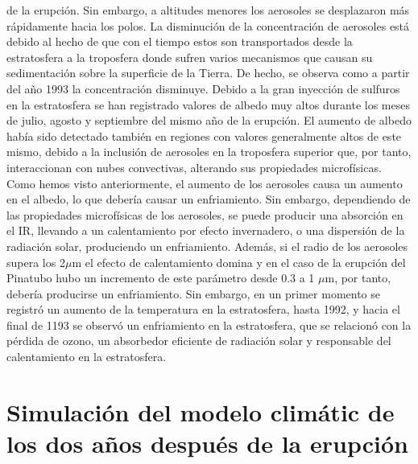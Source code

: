 \documentclass[a4apaper,twocolumn,10pt]{article}
\begin{document}
de la erupci\'on. Sin embargo, a altitudes menores los aerosoles se desplazaron m\'as r\'apidamente hacia los polos. La disminuci\'on de la concentraci\'on de aerosoles est\'a debido al hecho de que con el tiempo estos son transportados desde la estratosfera a la troposfera donde sufren varios mecanismos que causan su sedimentaci\'on sobre la superficie de la Tierra. De hecho, se observa como a partir del a\~no 1993 la concentraci\'on disminuye. Debido a la gran inyecci\'on de sulfuros en la estratosfera se han registrado valores de albedo muy altos durante los meses de julio, agosto y septiembre del mismo a\~no de la erupci\'on.
El aumento de albedo hab\'ia sido detectado tambi\'en en regiones con valores generalmente altos de este mismo, debido a la inclusi\'on de aerosoles en la troposfera superior que, por tanto, interaccionan con nubes convectivas, alterando sus propiedades microf\'isicas. Como hemos visto
anteriormente, el aumento de los aerosoles causa un aumento en el albedo, lo que deber\'ia causar un enfriamiento. Sin embargo, dependiendo de las propiedades microf\'isicas de los aerosoles, se puede producir una absorción en el IR, llevando a un calentamiento por efecto invernadero, o una dispersi\'on de la radiaci\'on solar, produciendo un enfriamiento. Adem\'as, si el
radio de los aerosoles supera los 2$\mu$m el efecto de calentamiento domina y en el caso de la erupci\'on del Pinatubo hubo un incremento de este par\'ametro desde 0.3 a 1 $\mu$m, por tanto, deber\'ia producirse un enfriamiento. Sin embargo, en un primer momento se registr\'o un aumento de la temperatura en la estratosfera, hasta 1992, y hacia el final de 1193 se observ\'o
un enfriamiento en la estratosfera, que se relacion\'o con la p\'erdida de ozono, un absorbedor eficiente de radiaci\'on solar y responsable del calentamiento en la estratosfera.

\section{Simulaci\'on del modelo clim\'atic de los dos a\~nos despu\'es de la erupci\'on}

\afterpage{\null\newpage}
\newpage


\end{document}
